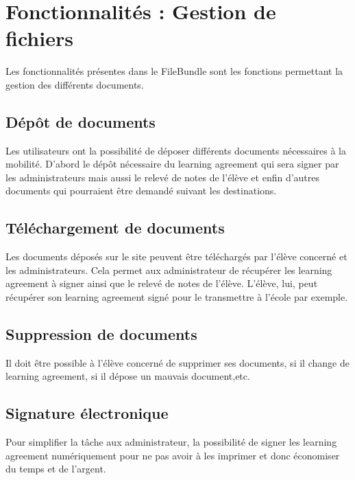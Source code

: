 \chapter{Fonctionnalités : Gestion de fichiers}

Les fonctionnalités présentes dans le FileBundle sont les fonctions permettant la gestion des différents documents.

\section{Dépôt de documents}

Les utilisateurs ont la possibilité de déposer différents documents nécessaires à la mobilité. D'abord le dépôt nécessaire du learning agreement qui sera signer par les administrateurs mais aussi le relevé de notes de l'élève et enfin d'autres documents qui pourraient être demandé suivant les destinations.

\section{Téléchargement de documents}

Les documents déposés sur le site peuvent être téléchargés par l'élève concerné et les administrateurs. Cela permet aux administrateur de récupérer les learning agreement à signer ainsi que le relevé de notes de l'élève. L'élève, lui, peut récupérer son learning agreement signé pour le transmettre à l'école par exemple.

\section{Suppression de documents}

Il doit être possible à l'élève concerné de supprimer ses documents, si il change de learning agreement, si il dépose un mauvais document,etc. 

\section{Signature électronique}

Pour simplifier la tâche aux administrateur, la possibilité de signer les learning agreement numériquement pour ne pas avoir à les imprimer et donc économiser du temps et de l'argent.